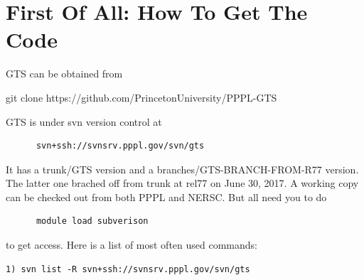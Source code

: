 \documentclass{report}
\begin{document}
\section{First Of All: How To Get The Code}
\label{sec:svn}
GTS can be obtained from

git clone https://github.com/PrincetonUniversity/PPPL-GTS

\iffalse
GTS is under svn version control at

\begin{verbatim}
      svn+ssh://svnsrv.pppl.gov/svn/gts
\end{verbatim}

\noindent
It has a trunk/GTS version and a branches/GTS-BRANCH-FROM-R77 version.
The latter one brached off from trunk at rel77 on June 30, 2017.
A working copy can be checked out from both PPPL and NERSC. But all need you to do

\begin{verbatim}
      module load subverison 
\end{verbatim}

\noindent
to get access. Here is a list of most often used commands:

\begin{verbatim}
1) svn list -R svn+ssh://svnsrv.pppl.gov/svn/gts
\end{verbatim}
\end{document}
